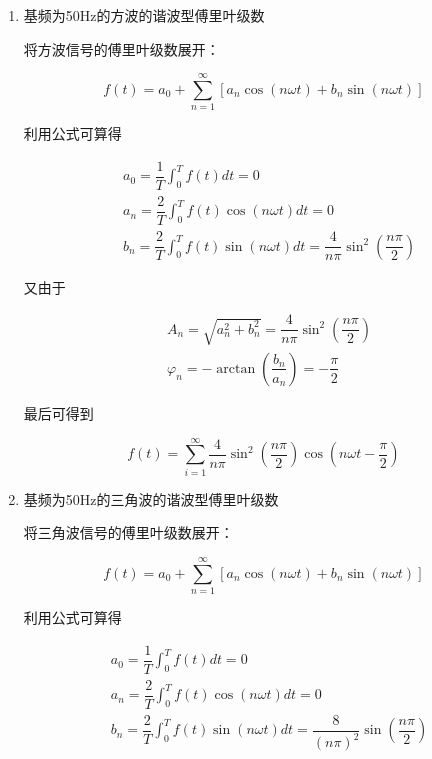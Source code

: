 \documentclass[dvipsnames, svgnames,a4paper,11pt]{article}
\begin{document}
\begin{enumerate}
  \item 基频为50Hz的方波的谐波型傅里叶级数
    
    将方波信号的傅里叶级数展开：

    \begin{equation*}
      f(t) = a_0 + \sum_{n = 1}^{\infty} \left [ a_n \cos (n\omega t) + b_n \sin (n\omega t) \right ]
    \end{equation*}

    利用公式可算得

    \begin{align*}
      & a_0 = \dfrac{1}{T}\int_{0}^{T}f(t)dt = 0 \\
      & a_n = \dfrac{2}{T}\int_{0}^{T}f(t)\cos (n\omega t)dt = 0 \\
      & b_n = \dfrac{2}{T}\int_{0}^{T}f(t)\sin (n\omega t)dt = \dfrac{4}{n\pi}\sin^2 (\dfrac{n\pi}{2})
    \end{align*}
      
    又由于

    \begin{align*}
      & A_n = \sqrt{a_n^2 + b_n^2} = \dfrac{4}{n\pi}\sin^2 (\dfrac{n\pi}{2})\\
      & \varphi_n = -\arctan (\dfrac{b_n}{a_n}) = -\dfrac{\pi}{2}
    \end{align*}
      
    最后可得到

    \begin{equation*}
      f(t) = \sum_{i = 1}^{\infty} \dfrac{4}{n\pi}\sin^2 (\dfrac{n\pi}{2}) \cos(n\omega t -\dfrac{\pi}{2})
    \end{equation*}

  \item 基频为50Hz的三角波的谐波型傅里叶级数
  
  将三角波信号的傅里叶级数展开：

  \begin{equation*}
    f(t) = a_0 + \sum_{n = 1}^{\infty} \left [ a_n \cos (n\omega t) + b_n \sin (n\omega t) \right ]
  \end{equation*}

  利用公式可算得

  \begin{align*}
    & a_0 = \dfrac{1}{T}\int_{0}^{T}f(t)dt = 0 \\
    & a_n = \dfrac{2}{T}\int_{0}^{T}f(t)\cos (n\omega t)dt = 0 \\
    & b_n = \dfrac{2}{T}\int_{0}^{T}f(t)\sin (n\omega t)dt = \dfrac{8}{(n\pi)^2}\sin (\dfrac{n\pi}{2})
  \end{align*}
    

\end{enumerate}
\end{document}
